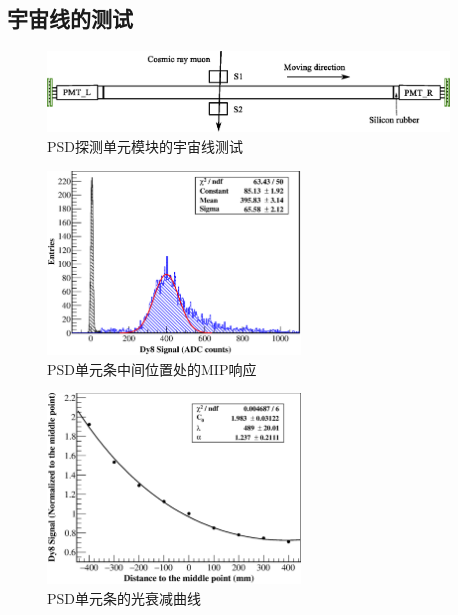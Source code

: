 \label{sec:dynamic_range:verification}


\subsection{宇宙线的测试}
\label{sec:dynamic_range:cosmic_ray}

\begin{figure}[!htbp]
	\centering
	\includegraphics[width=0.95\textwidth]{chap/dynamic_range/fig/cosmic_test.eps}
	\caption{PSD探测单元模块的宇宙线测试}
	\label{fig:dynamic_range:cosmic_test}
\end{figure}

\begin{figure}[!htbp]
	\centering
	\includegraphics[width=0.6\textwidth]{chap/dynamic_range/fig/mip.eps}
	\caption{PSD单元条中间位置处的MIP响应}
	\label{fig:dynamic_range:mip}
\end{figure}

\begin{figure}[!htbp]
	\centering
	\includegraphics[width=0.6\textwidth]{chap/dynamic_range/fig/atten_right.eps}
	\caption{PSD单元条的光衰减曲线}
	\label{fig:dynamic_range:attenuation}
\end{figure}

